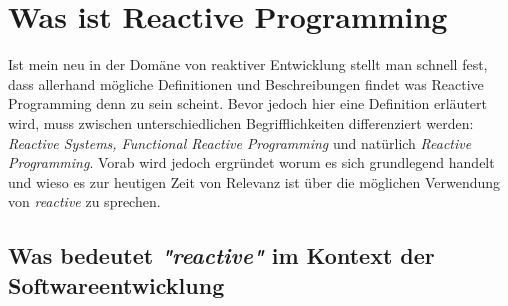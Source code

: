 \chapter{Was ist Reactive Programming}\label{was_ist_reactive_programming}
Ist mein neu in der Domäne von reaktiver Entwicklung stellt man schnell fest, dass allerhand mögliche Definitionen und Beschreibungen findet was Reactive Programming denn zu sein scheint. Bevor jedoch hier eine Definition erläutert wird, muss zwischen unterschiedlichen Begrifflichkeiten differenziert werden: \textit{Reactive Systems, Functional Reactive Programming} und natürlich \textit{Reactive Programming}. Vorab wird jedoch ergründet worum es sich grundlegend handelt und wieso es zur heutigen Zeit von Relevanz ist über die möglichen Verwendung von \textit{reactive} zu sprechen.
\section{Was bedeutet \textit{"reactive"} im Kontext der Softwareentwicklung}
